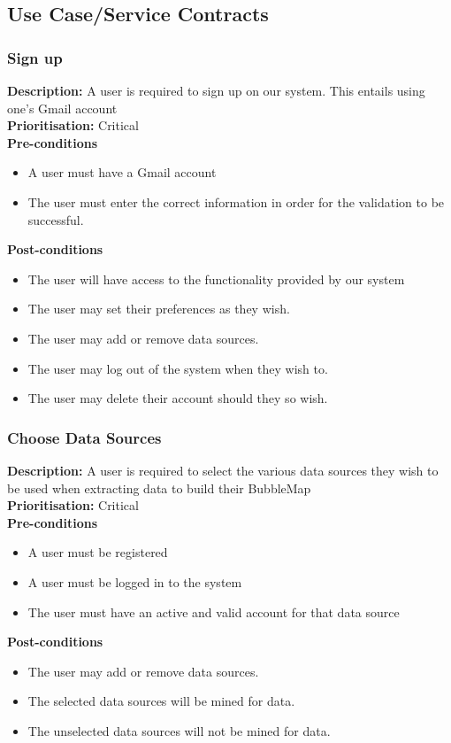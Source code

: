 \documentclass[hidelinks,english]{article}
\begin{document}
		\subsection{Use Case/Service Contracts}
			\subsubsection{Sign up}
				\textbf{Description:}  A user is required to sign up on our system. This entails using one's Gmail account
				\\
    			\textbf{Prioritisation:} Critical\\
      			\textbf{Pre-conditions}
    			\begin{itemize}
        			\item A user must have a Gmail account
        			\item The user must enter the correct information in order for the validation to be successful.
    			\end{itemize}
    			\textbf{Post-conditions}
     			\begin{itemize}
        			\item The user will have access to the functionality provided by our system
        			\item The user may set their preferences as they wish.
        			\item The user may add or remove data sources.
        			\item The user may log out of the system when they wish to.
        			\item The user may delete their account should they so wish.
    			\end{itemize}
    		\subsubsection{Choose Data Sources}
				\textbf{Description:}  A user is required to select the various data sources they wish to be used when extracting data to build their BubbleMap
				\\
    			\textbf{Prioritisation:} Critical\\
      			\textbf{Pre-conditions}
    			\begin{itemize}
        			\item A user must be registered
        			\item A user must be logged in to the system
        			\item The user must have an active and valid account for that data source
    			\end{itemize}
    			\textbf{Post-conditions}
     			\begin{itemize}
        			\item The user may add or remove data sources.
        			\item The selected data sources will be mined for data.
        			\item The unselected data sources will not be mined for data.
    			\end{itemize}
\end{document}
